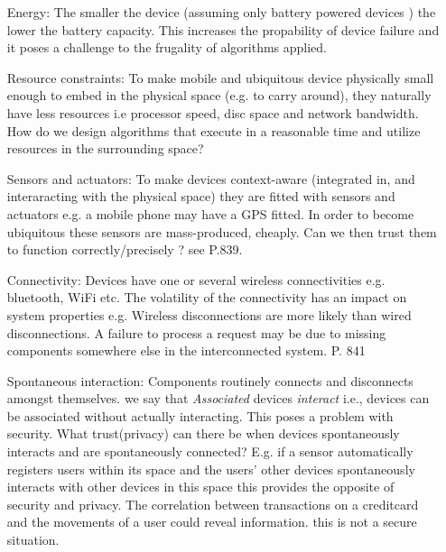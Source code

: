\begin{itemize}
\item[Energy:] The smaller the device (assuming only battery powered devices ) the lower the battery capacity. This increases the propability of device failure and it poses a challenge to the frugality of algorithms applied.\\

\item[Resource constraints:] To make mobile and ubiquitous device physically small enough to embed in the physical space (e.g. to carry around), they naturally have less resources i.e processor speed, disc space and network bandwidth. How do we design algorithms that execute in a reasonable time and utilize resources in the surrounding space?\\

\item[Sensors and actuators:] To make devices context-aware (integrated in, and interaracting with the physical space) they are fitted with sensors and actuators e.g. a mobile phone may have a GPS fitted. In order to become ubiquitous these sensors are mass-produced, cheaply. Can we then trust them to function correctly/precisely ?  see P.839.\\

\item[Connectivity:] Devices have one or several wireless connectivities e.g. bluetooth, WiFi etc. The volatility of the connectivity has an impact on system properties e.g. Wireless disconnections are more likely than wired disconnections. A failure to process a request may be due to missing components somewhere else in the interconnected system. P. 841 \\ 


\item[Spontaneous interaction:] Components routinely connects and disconnects amongst themselves. we say that 
\textit{Associated} devices \textit{interact} i.e., devices can be associated without actually interacting. This poses a problem with security. What trust(privacy) can there be when devices spontaneously interacts and are spontaneously connected? E.g. if a sensor automatically registers users within its space and the users' other devices spontaneously interacts with other devices in this space this provides the opposite of security and privacy. The correlation between transactions on a creditcard and the movements of a user could reveal information. this is not a secure situation. \\
\end{itemize}


